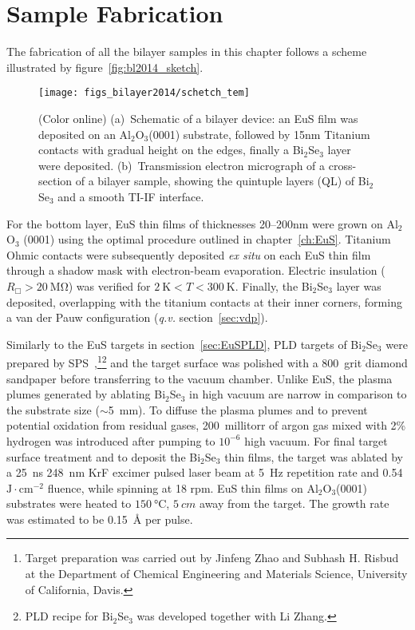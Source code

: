 \section{Sample Fabrication}\label{sec:bilayer2014_char}
The fabrication of all the bilayer samples in this chapter follows a scheme illustrated by figure~\ref{fig:bl2014_sketch}.%
\begin{figure}[h]%
    \centering%
    \subfloat{\label{fig:bl2014_sketch}}%
    \subfloat{\label{fig:bl2014_TEM}}%
    \texttt{[image: figs\_bilayer2014/schetch\_tem]}%
    \caption[Schematic and cross-section micrograph of Bi$_2$Se$_3$--EuS thin film bilayers]{(Color online) (a)~Schematic of a bilayer device: an EuS film was deposited on an Al$_2$O$_3$(0001) substrate, followed by 15nm Titanium contacts with gradual height on the edges, finally a Bi$_2$Se$_3$ layer were deposited. (b)~Transmission electron micrograph of a cross-section of a bilayer sample, showing the quintuple layers (QL) of Bi$_2$Se$_3$ and a smooth TI-IF interface.}%
\end{figure} %
%
For the bottom layer, EuS thin films of thicknesses 20--200nm were grown on Al$_2$O$_3$ (0001) using the optimal procedure outlined in chapter~\ref{ch:EuS}. Titanium Ohmic contacts were subsequently deposited \textit{ex situ} on each EuS thin film through a shadow mask with electron-beam evaporation. Electric insulation ($R_\Box > 20~\mathrm{M\Omega}$) was verified for $2~\mathrm{K}<T<300~\mathrm{K}$. Finally, the Bi$_2$Se$_3$ layer was deposited, overlapping with the titanium contacts at their inner corners, forming a van der Pauw configuration (\textit{q.v.} section~\ref{sec:vdp}).

Similarly to the EuS targets in section~\ref{sec:EuSPLD}, PLD targets of Bi$_2$Se$_3$ were prepared by SPS~\cite{Jinfeng2, Subhash1},\footnote{Target preparation was carried out by Jinfeng Zhao and Subhash H. Risbud at the Department of Chemical Engineering and Materials Science, University of California, Davis.}\footnote{PLD recipe for Bi$_2$Se$_3$ was developed together with Li Zhang.} and the target surface was polished with a 800~grit diamond sandpaper before transferring to the vacuum chamber. Unlike EuS, the plasma plumes generated by ablating Bi$_2$Se$_3$ in high vacuum are narrow in comparison to the substrate size ($\sim$5~mm). To diffuse the plasma plumes and to prevent potential oxidation from residual gases, 200~millitorr of argon gas mixed with 2\% hydrogen was introduced after pumping to $10^{-6}$ high vacuum. For final target surface treatment and to deposit the Bi$_2$Se$_3$ thin films, the target was ablated by a 25~ns 248~nm KrF excimer pulsed laser beam at 5~Hz repetition rate and 0.54~$\mathrm{J\cdot{}cm^{-2}}$ fluence, while spinning at 18 rpm. EuS thin films on Al$_2$O$_3$(0001) substrates were heated to $\SI{150}{\degreeCelsius}$, $\SI{5}{cm}$ away from the target. The growth rate was estimated to be 0.15~\AA{} per pulse.

